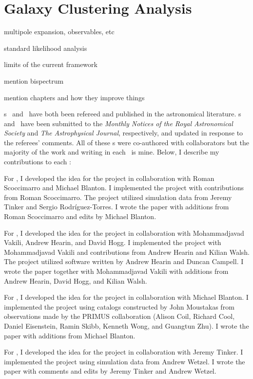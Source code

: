 \section{Galaxy Clustering Analysis}%

\begin{enumerate}
{\item 
multipole expansion, observables, etc
}
{\item 
standard likelihood analysis  
}
{\item 
limits of the current framework
}
{\item 
mention bispectrum
}
{\item 
mention chapters and how they improve things
}
\end{enumerate}

\chapname s~ and~ have both been refereed and
published in the astronomical literature.
\chapname s~ and~ have been submitted to the 
\emph{Monthly Notices of the Royal Astronomical Society} and \emph{The Astrophysical Journal},
respectively, and updated in response to the referees' comments.
All of these \chapname s were co-authored with collaborators but the majority
of the work and writing in each \chapname\ is mine.
Below, I describe my contributions to each \chapname:
\begin{enumerate}

{\item 
For , I developed the idea for the project in collaboration with Roman
Scoccimarro and Michael Blanton. I implemented the project with contributions 
from Roman Scoccimarro. The project utilized simulation data from Jeremy Tinker
and Sergio Rodr\'{i}guez-Torres. I wrote the paper with additions from 
Roman Scoccimarro and edits by Michael Blanton. 
}

{\item 
For , I developed the idea for the project in collaboration with 
Mohammadjavad Vakili, Andrew Hearin, and David Hogg. I implemented the project 
with Mohammadjavad Vakili and contributions from Andrew Hearin and Kilian Walsh.
The project utilized software written by Andrew Hearin and Duncan Campell. 
I wrote the paper together with Mohammadjavad Vakili with additions from
Andrew Hearin, David Hogg, and Kilian Walsh.
}

{\item 
For , I developed the idea for the project in collaboration with 
Michael Blanton. I implemented the project using catalogs constructed by 
John Moustakas from observations made by the PRIMUS collaboration (Alison Coil,
Richard Cool, Daniel Eisenstein, Ramin Skibb, Kenneth Wong, and Guangtun Zhu).
I wrote the paper with additions from Michael Blanton. 
}

{\item 
For , I developed the idea for the project in collaboration with 
Jeremy Tinker. I implemented the project using simulation data from Andrew 
Wetzel. I wrote the paper with comments and edits by Jeremy Tinker and Andrew 
Wetzel. 
}
\end{enumerate}



